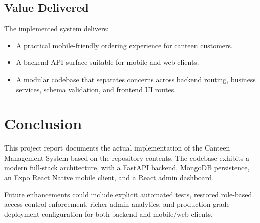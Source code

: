 \documentclass[12pt,a4paper]{report}
\begin{document}
\section{Value Delivered}
The implemented system delivers:
\begin{itemize}
  \item A practical mobile-friendly ordering experience for canteen customers.
  \item A backend API surface suitable for mobile and web clients.
  \item A modular codebase that separates concerns across backend routing, business services, schema validation, and frontend UI routes.
\end{itemize}

\chapter{Conclusion}
This project report documents the actual implementation of the Canteen Management System based on the repository contents. The codebase exhibits a modern full-stack architecture, with a FastAPI backend, MongoDB persistence, an Expo React Native mobile client, and a React admin dashboard.

Future enhancements could include explicit automated tests, restored role-based access control enforcement, richer admin analytics, and production-grade deployment configuration for both backend and mobile/web clients.
\end{document}
